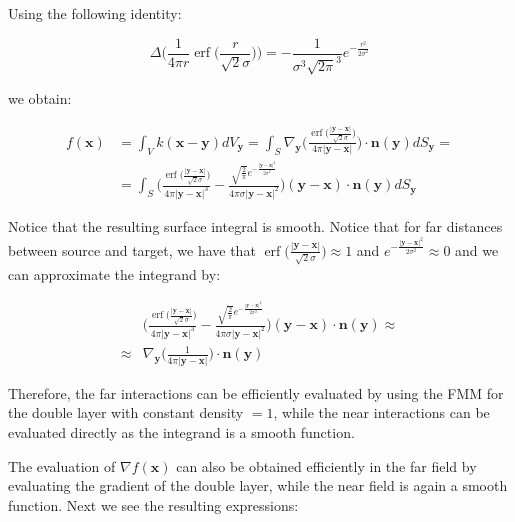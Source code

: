 \documentclass[11pt, oneside]{article}
\DeclareMathOperator\erf{erf}
\newcommand\bx{\boldsymbol x}
\newcommand\by{\boldsymbol y}
\newcommand\bn{\boldsymbol n}
\begin{document}
Using the following identity:

\begin{equation}
\Delta\Big(\frac{1}{4\pi r}\erf\Big(\frac{r}{\sqrt{2}\sigma}\Big)\Big)=-\frac{1}{\sigma^3\sqrt{2\pi}^3}e^{-\frac{r^2}{2\sigma^2}}
\end{equation}
 
 we obtain:
 
\begin{equation}\label{surf_f}
\begin{aligned}
f(\bx)&=\int_{V}k(\bx-\by)dV_{\by}=\int_{\mathit{S}}\nabla_{\by}\Big(\frac{\erf\big(\frac{|\by-\bx|}{\sqrt{2}\sigma}\big)}{4\pi|\by-\bx|}\Big)\cdot\bn(\by)dS_{\by}=\\
&=\int_{\mathit{S}}\Bigg(\frac{\erf\big(\frac{|\by-\bx|}{\sqrt{2}\sigma}\big)}{4\pi|\by-\bx|^3}-\frac{\sqrt{\frac{2}{\pi}}e^{-\frac{|\by-\bx|^2}{2\sigma^2}}}{4\pi\sigma|\by-\bx|^2}\Bigg)(\by-\bx)\cdot\bn(\by)dS_{\by}
\end{aligned}
\end{equation}

Notice that the resulting surface integral is smooth. Notice that for far distances between source and target, we have that $\erf\big(\frac{|\by-\bx|}{\sqrt{2}\sigma}\big)\approx 1$ and $e^{-\frac{|\by-\bx|^2}{2\sigma^2}}\approx 0$ and we can approximate the integrand by:

\begin{equation}
\begin{aligned}
&\Bigg(\frac{\erf\big(\frac{|\by-\bx|}{\sqrt{2}\sigma}\big)}{4\pi|\by-\bx|^3}-\frac{\sqrt{\frac{2}{\pi}}e^{-\frac{|\by-\bx|^2}{2\sigma^2}}}{4\pi\sigma|\by-\bx|^2}\Bigg)(\by-\bx)\cdot\bn(\by)\approx\\
\approx &\nabla_{\by}\Big(\frac{1}{4\pi|\by-\bx|}\Big)\cdot\bn(\by)
\end{aligned}
\end{equation}

Therefore, the far interactions can be efficiently evaluated by using the FMM for the double layer with constant density $=1$, while the near interactions can be evaluated directly as the integrand is a smooth function.

The evaluation of $\nabla f(\bx)$ can also be obtained efficiently in the far field by evaluating the gradient of the double layer, while the near field is again a smooth function. Next we see the resulting expressions:
\end{document}
